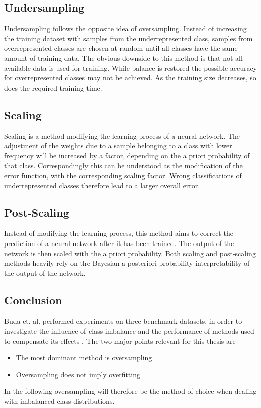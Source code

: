 \subsection{Undersampling}
Undersampling follows the opposite idea of oversampling. Instead of increasing the training dataset with samples from the underrepresented class, samples from overrepresented classes are chosen at random until all classes have the same amount of training data. The obvious downside to this method is that not all available data is used for training. While balance is restored the possible accuracy for overrepresented classes may not be achieved. As the training size decreases, so does the required training time. \\

\subsection{Scaling}
Scaling is a method modifying the learning process of a neural network. The adjustment of the weights due to a sample belonging to a class with lower frequency will be increased by a factor, depending on the a priori probability of that class. Correspondingly this can be understood as the modification of the error function, with the corresponding scaling factor. Wrong classifications of underrepresented classes therefore lead to a larger overall error. 

\subsection{Post-Scaling}
Instead of modifying the learning process, this method aims to correct the prediction of a neural network after it has been trained. The output of the network is then scaled with the a priori probability. Both scaling and post-scaling methods heavily rely on the Bayesian a posteriori probability interpretability of the output of the network.\\

\subsection{Conclusion}
Buda et. al. performed experiments on three benchmark datasets, in order to investigate the influence of class imbalance and the performance of methods used to compensate its effects \cite{Buda2017}. The two major points relevant for this thesis are 
\begin{itemize}
\item The most dominant method is oversampling
\item Oversampling does not imply overfitting
\end{itemize}
In the following oversampling will therefore be the method of choice when dealing with imbalanced class distributions.

